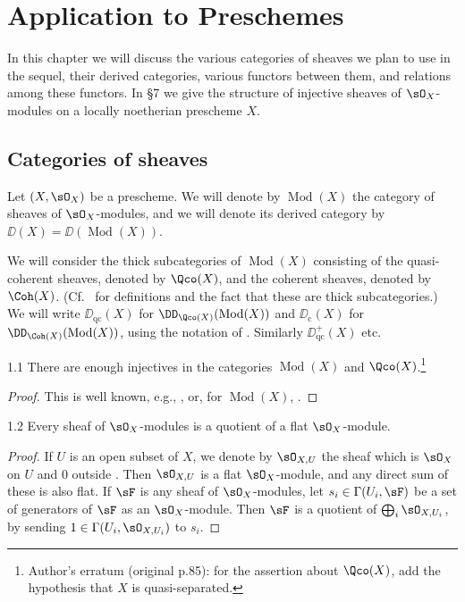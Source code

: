 \chapter{Application to Preschemes}

In this chapter we will discuss the various categories of sheaves we plan to use in the sequel, their derived categories, various functors between them, and relations among these functors. In \S7 we give the structure of injective sheaves of $\sO_X$-modules on a locally noetherian prescheme $X$.

\section{Categories of sheaves}\label{sec:2.1}

Let $(X,\sO_X)$ be a prescheme. We will denote by $\operatorname{Mod}(X)$ the category of sheaves of $\sO_X$-modules, and we will denote its derived category by $\DD(X)=\DD(\operatorname{Mod}(X))$.

We will consider the thick subcategories of $\operatorname{Mod}(X)$ consisting of the quasi-coherent sheaves, denoted by $\Qco(X)$, and the coherent sheaves, denoted by $\Coh(X)$. (Cf.\ \cite[\nopp $0$, \S5]{EGA} for definitions and the fact that these are thick subcategories.) We will write $\DD_{\mathrm{qc}}(X)$ for $\DD_{\Qco(X)}(\operatorname{Mod}(X))$ and $\DD_{\mathrm{c}}(X)$ for $\DD_{\Coh(X)}(\operatorname{Mod}(X))$, using the notation of . Similarly $\DD_{\mathrm{qc}}^+(X)$ etc.

\begin{bookproposition}{1.1}\label{prop:2.1.1}
There are enough injectives in the categories $\operatorname{Mod}(X)$ and $\Qco(X)$.\footnote{Author's erratum (original p.85): for the assertion about $\Qco(X)$, add the hypothesis that $X$ is quasi-separated.}
\end{bookproposition}

\begin{proof}
This is well known, e.g., \cite[.1]{T}, or, for $\operatorname{Mod}(X)$, \cite[\nopp II,~7.1.1]{G}.
\end{proof}

\begin{bookproposition}{1.2}\label{prop:2.1.2}
Every sheaf of $\sO_X$-modules is a quotient of a flat $\sO_X$-module.
\end{bookproposition}

\begin{proof}
If $U$ is an open subset of $X$, we denote by $\sO_{X,U}$ the sheaf which is $\sO_X$ on $U$ and $0$ outside \cite[\nopp II, Thm.~2.9.1]{G}. Then $\sO_{X,U}$ is a flat $\sO_X$-module, and any direct sum of these is also flat. If $\sF$ is any sheaf of $\sO_X$-modules, let $s_i\in\Gamma(U_i,\sF)$ be a set of generators of $\sF$ as an $\sO_X$-module. Then $\sF$ is a quotient of $\bigoplus_i \sO_{X,U_i}$, by sending $1\in\Gamma(U_i,\sO_{X,U_i})$ to $s_i$.
\end{proof}

